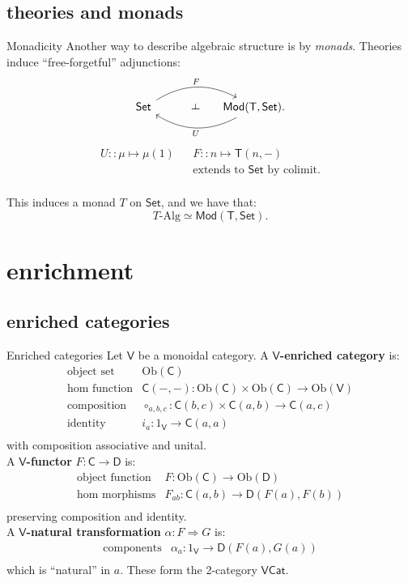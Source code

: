 \documentclass{beamer}
\def\ld{\rotatebox[origin=c]{-90}{$\dashv$}} %
\newcommand{\Set}{\mathsf{Set}}
\newcommand{\Cat}{\mathsf{Cat}}
\newcommand{\Mod}{\mathsf{Mod}}
\newcommand{\V}{\mathsf{V}}
\newcommand{\D}{\mathsf{D}}
\newcommand{\C}{\mathsf{C}}
\newcommand{\T}{\mathsf{T}}
\newcommand{\Obj}{\mathrm{Ob}}
\newcommand{\maps}{\colon}
\begin{document}
\subsection{theories and monads}
\begin{frame}{Monadicity}
  Another way to describe algebraic structure is by \textit{monads}. Theories induce ``free-forgetful'' adjunctions: 
  \[\begin{tikzcd}[column sep=small, ampersand replacement=\&]
      \Set \arrow[bend left,below]{rr}{F}
      \& {\phantom{AA} \ld} \&
      \arrow[bend left,above]{ll}{U} \Mod(\T,\Set).
    \end{tikzcd}\]
  \[\begin{array}{lll}
      U :: \mu\mapsto \mu(1) && F :: n\mapsto \T(n,-)\\
      && \text{extends to $\Set$ by colimit.}
    \end{array}\]\\
  This induces a monad $T$ on $\Set$, and we have that:
  $$T\text{-Alg} \simeq \Mod(\T,\Set).$$
\end{frame}

\section{enrichment}
\subsection{enriched categories}
\begin{frame}{Enriched categories}
Let $\V$ be a monoidal category. A \textbf{$\V$-enriched category} is:
  \[\begin{array}{ll}
\text{object set} & \Obj(\C)\\
\text{hom function} & \C(-,-)\maps \Obj(\C) \times \Obj(\C) \to \Obj(\V)\\
\text{composition} & \circ_{a,b,c}\maps\C(b,c) \times \C(a,b) \to \C(a,c)\\
\text{identity} & i_a\maps 1_\V \to\C(a,a)\\
    \end{array}\]
  with composition associative and unital.\\
  A \textbf{$\V$-functor} $F\maps \C\to \D$ is:
  \[\begin{array}{ll}
\text{object function} & F\maps \Obj(\C) \to \Obj(\D)\\
\text{hom morphisms} & F_{ab}\maps \C(a,b) \to \D(F(a),F(b))\\
    \end{array}\]
  preserving composition and identity.\\
  A \textbf{$\V$-natural transformation} $\alpha\maps F \Rightarrow G$ is:
\[\begin{array}{ll}
\text{components} & \alpha_a \maps 1_\V \to \D(F(a),G(a))\\
\end{array}\]
 which is ``natural'' in $a$. These form the 2-category \textbf{$\V\Cat$}. 
\end{frame}
\end{document}
